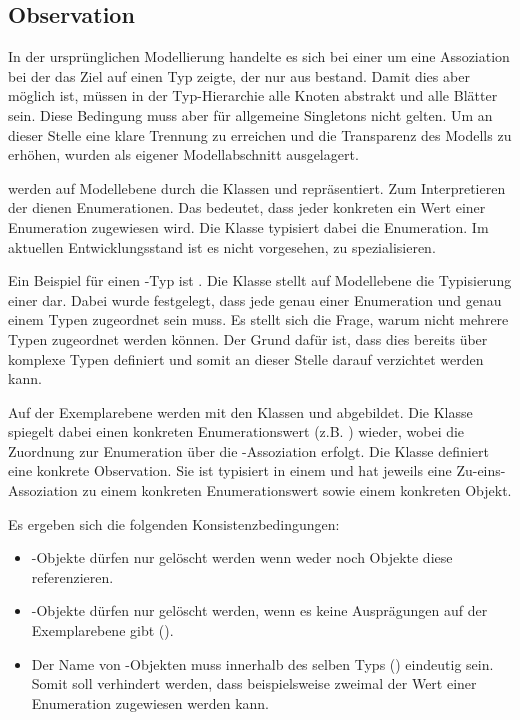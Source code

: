 \subsection{Observation}\label{Observations}
In der ursprünglichen Modellierung handelte es sich bei einer  um eine Assoziation bei der das Ziel auf einen 
Typ zeigte, der nur aus  bestand. Damit dies aber möglich ist, müssen in der Typ-Hierarchie alle Knoten 
abstrakt und alle Blätter  sein. Diese Bedingung muss aber für allgemeine Singletons nicht gelten. Um an dieser 
Stelle eine klare Trennung zu erreichen und die Transparenz des Modells zu erhöhen, wurden  als eigener Modellabschnitt ausgelagert.


 werden auf Modellebene durch die Klassen  und  repräsentiert. 
Zum Interpretieren der  dienen Enumerationen. Das bedeutet, dass jeder konkreten 
ein Wert einer Enumeration zugewiesen wird. Die Klasse  typisiert dabei die Enumeration. 
Im aktuellen Entwicklungsstand ist es nicht vorgesehen,  zu spezialisieren.

Ein Beispiel für einen -Typ ist . Die Klasse  stellt auf Modellebene die 
Typisierung einer  dar. Dabei wurde festgelegt, dass jede  genau einer Enumeration 
und genau einem Typen zugeordnet sein muss. Es stellt sich die Frage, warum nicht mehrere Typen zugeordnet werden können. 
Der Grund dafür ist, dass dies bereits über komplexe Typen definiert und somit an dieser Stelle darauf verzichtet werden kann.

Auf der Exemplarebene werden  mit den Klassen  und  abgebildet. 
Die Klasse  spiegelt dabei einen konkreten Enumerationswert (z.B. ) wieder, 
wobei die Zuordnung zur Enumeration über die -Assoziation erfolgt. Die Klasse  definiert eine konkrete Observation. 
Sie ist typisiert in einem  und hat jeweils eine Zu-eins-Assoziation zu einem konkreten Enumerationswert sowie einem konkreten Objekt.

Es ergeben sich die folgenden Konsistenzbedingungen:
\begin{itemize}
  \item {}-Objekte dürfen nur gelöscht werden wenn weder  noch  Objekte diese referenzieren.
  \item {}-Objekte dürfen nur gelöscht werden, wenn es keine Ausprägungen auf der Exemplarebene gibt ().
  \item Der Name von -Objekten muss innerhalb des selben Typs () eindeutig sein. Somit soll verhindert werden, dass beispielsweise zweimal der Wert  einer Enumeration  zugewiesen werden kann.
\end{itemize}

